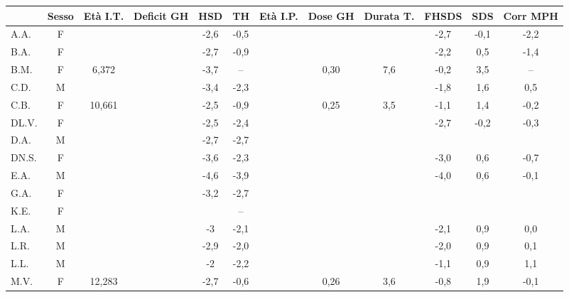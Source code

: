 \begin{sidewaystable}
\centering
\begin{tabular}{lccccccccccc}
\toprule
 	& Sesso & Età I.T. & Deficit GH & HSD %
 	& TH %
 	& Età I.P.
 	& Dose GH
 	& Durata T.
 	& FHSDS
 	& \Delta SDS
 	& Corr MPH
 	\\
\midrule                                
A.A.	& F	&          &  		&  -2,6 & -0,5  &  &  	  &      & -2,7  & -0,1 & -2,2                    \\
B.A.	& F	&          & \checkmark &  -2,7 & -0,9  &  &      &      & -2,2  & 0,5  & -1,4                    \\
B.M.	& F	&  6,372   & \checkmark &  -3,7 & --    &  & 0,30 &  7,6 & -0,2  & 3,5  & --                      \\
C.D.	& M	&          & \checkmark &  -3,4 & -2,3  &  &      &      & -1,8  & 1,6  & 0,5                     \\
C.B.	& F     & 10,661   &  		&  -2,5 & -0,9  &  & 0,25 &  3,5 & -1,1  & 1,4  & -0,2                           \\
DL.V.	& F	&          & \checkmark &  -2,5 & -2,4  &  &      &      & -2,7  & -0,2 & -0,3                    \\
D.A.	& M	&          &  		&  -2,7 & -2,7  &  &      &      &       &      &                                \\
DN.S.	& F	&          & \checkmark &  -3,6 & -2,3  &  &      &      & -3,0  & 0,6  & -0,7                    \\
E.A.	& M	&          &  		&  -4,6 & -3,9  &  &      &      & -4,0  & 0,6  & -0,1                           \\
G.A.	& F	&          &  		&  -3,2 & -2,7  &  &      &      &       &      &                                \\
K.E.	& F	&          &  		&       & --    &  &      &      &       &      &                                \\
L.A.	& M	&          & \checkmark &  -3   & -2,1  &  &      &      & -2,1  & 0,9  & 0,0                     \\
L.R.	& M	&          &  		&  -2,9 & -2,0  &  &      &      & -2,0  & 0,9  & 0,1                            \\
L.L.	& M	&          &  		&  -2   & -2,2  &  &      &      & -1,1  & 0,9  & 1,1                            \\
M.V.	& F	& 12,283   & \checkmark &  -2,7 & -0,6  &  & 0,26 &  3,6 & -0,8  & 1,9  & -0,1                    \\

\end{tabular}
\end{sidewaystable}
